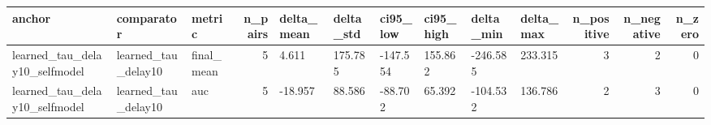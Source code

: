 \begin{tabular}{lllrllllllrrr}
\toprule
anchor & comparator & metric & n_pairs & delta_mean & delta_std & ci95_low & ci95_high & delta_min & delta_max & n_positive & n_negative & n_zero \\
\midrule
learned_tau_delay10_selfmodel & learned_tau_delay10 & final_mean & 5 & 4.611 & 175.785 & -147.554 & 155.862 & -246.585 & 233.315 & 3 & 2 & 0 \\
learned_tau_delay10_selfmodel & learned_tau_delay10 & auc & 5 & -18.957 & 88.586 & -88.702 & 65.392 & -104.532 & 136.786 & 2 & 3 & 0 \\
\bottomrule
\end{tabular}
